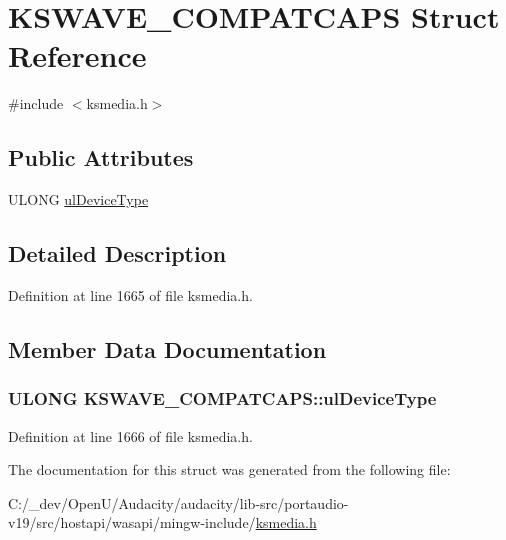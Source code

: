 \hypertarget{struct_k_s_w_a_v_e___c_o_m_p_a_t_c_a_p_s}{}\section{K\+S\+W\+A\+V\+E\+\_\+\+C\+O\+M\+P\+A\+T\+C\+A\+PS Struct Reference}
\label{struct_k_s_w_a_v_e___c_o_m_p_a_t_c_a_p_s}


{\ttfamily \#include $<$ksmedia.\+h$>$}

\subsection*{Public Attributes}
\begin{DoxyCompactItemize}
\item 
U\+L\+O\+NG \hyperlink{struct_k_s_w_a_v_e___c_o_m_p_a_t_c_a_p_s_a585001ce93335c64dcb30a4c58b6d4f5}{ul\+Device\+Type}
\end{DoxyCompactItemize}


\subsection{Detailed Description}


Definition at line 1665 of file ksmedia.\+h.



\subsection{Member Data Documentation}
\subsubsection[{\texorpdfstring{ul\+Device\+Type}{ulDeviceType}}]{\setlength{\rightskip}{0pt plus 5cm}U\+L\+O\+NG K\+S\+W\+A\+V\+E\+\_\+\+C\+O\+M\+P\+A\+T\+C\+A\+P\+S\+::ul\+Device\+Type}\hypertarget{struct_k_s_w_a_v_e___c_o_m_p_a_t_c_a_p_s_a585001ce93335c64dcb30a4c58b6d4f5}{}\label{struct_k_s_w_a_v_e___c_o_m_p_a_t_c_a_p_s_a585001ce93335c64dcb30a4c58b6d4f5}


Definition at line 1666 of file ksmedia.\+h.



The documentation for this struct was generated from the following file\+:\begin{DoxyCompactItemize}
\item 
C\+:/\+\_\+dev/\+Open\+U/\+Audacity/audacity/lib-\/src/portaudio-\/v19/src/hostapi/wasapi/mingw-\/include/\hyperlink{ksmedia_8h}{ksmedia.\+h}\end{DoxyCompactItemize}

